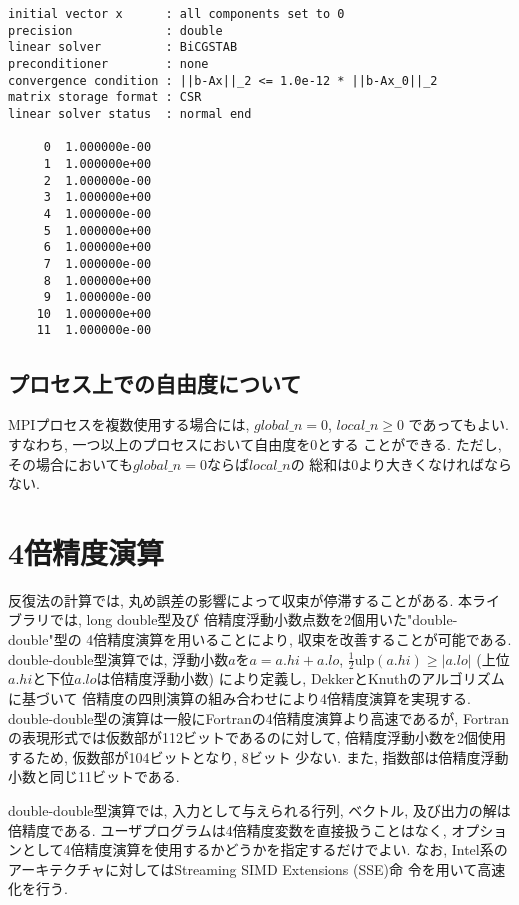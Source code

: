 \documentclass[a4paper]{jarticle}
\begin{document}
{{\begin{verbatim}
initial vector x      : all components set to 0
precision             : double
linear solver         : BiCGSTAB
preconditioner        : none
convergence condition : ||b-Ax||_2 <= 1.0e-12 * ||b-Ax_0||_2
matrix storage format : CSR
linear solver status  : normal end

     0  1.000000e-00
     1  1.000000e+00
     2  1.000000e-00
     3  1.000000e+00
     4  1.000000e-00
     5  1.000000e+00
     6  1.000000e+00
     7  1.000000e-00
     8  1.000000e+00
     9  1.000000e-00
    10  1.000000e+00
    11  1.000000e-00
\end{verbatim}

\subsection{プロセス上での自由度について}
MPIプロセスを複数使用する場合には, $global\_n=0$, $local\_n \ge 0$
であってもよい. すなわち, 一つ以上のプロセスにおいて自由度を0とする
ことができる. ただし, その場合においても$global\_n=0$ならば$local\_n$の
総和は0より大きくなければならない. 

\newpage
\section{4倍精度演算}
\label{sec:quadruple}
反復法の計算では, 丸め誤差の影響によって収束が停滞することがある. 
本ライブラリでは, long double型及び
倍精度浮動小数点数を2個用いた"double-double"\cite{dd,qd}型の
4倍精度演算を用いることにより, 収束を改善することが可能である. 
double-double型演算では, 浮動小数$a$を$a = a.hi + a.lo$, 
$\frac{1}{2} \mbox{ulp}(a.hi) \geq |a.lo|$
 (上位$a.hi$と下位$a.lo$は倍精度浮動小数) 
により定義し, Dekker\cite{dekker}とKnuth\cite{Knuth}のアルゴリズムに基づいて
倍精度の四則演算の組み合わせにより4倍精度演算を実現する. 
double-double型の演算は一般にFortranの4倍精度演算より高速である\cite{Bailey:High-Precision}が, 
Fortranの表現形式\cite{intel}では仮数部が112ビットであるのに対して, 
倍精度浮動小数を2個使用するため, 仮数部が104ビットとなり, 8ビット
少ない. また, 指数部は倍精度浮動小数と同じ11ビットである. 

double-double型演算では, 入力として与えられる行列, ベクトル, 
及び出力の解は倍精度である. 
ユーザプログラムは4倍精度変数を直接扱うことはなく, 
オプションとして4倍精度演算を使用するかどうかを指定するだけでよい. 
なお, Intel系のアーキテクチャに対してはStreaming SIMD Extensions (SSE)命
令を用いて高速化を行う\cite{quadlis}. 

}}
\end{document}
